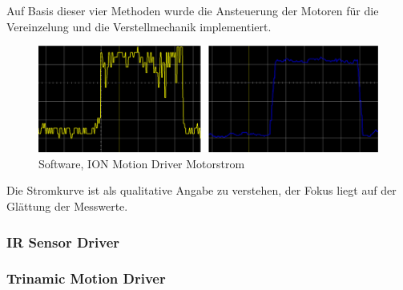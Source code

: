 Auf Basis dieser vier Methoden wurde die Ansteuerung der Motoren für die Vereinzelung und die Verstellmechanik implementiert.



\begin{figure}[H]
	\includegraphics[width=1\textwidth]{Illustrationen/6-Umsetzung/ION_Motion_Strommessung.png}
	\caption{Software, ION Motion Driver Motorstrom}
	\label{fig:ION_Motion_Strommessung}
\end{figure}

Die Stromkurve ist als qualitative Angabe zu verstehen, der Fokus liegt auf der Glättung der Messwerte.

\subsubsection{IR Sensor Driver}

\subsubsection{Trinamic Motion Driver}